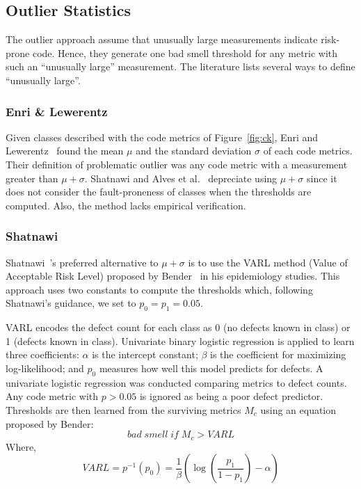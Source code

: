 \documentclass[twocolumn,5p]{elsarticle}
\newcommand{\fig}[1]{Figure~\ref{fig:#1}}
\theoremstyle{break}
\begin{document}
	\subsection{Outlier Statistics}
	
	The outlier approach assume that unusually large measurements indicate risk-prone code.
	Hence, they generate one bad smell threshold for any metric
	with such an ``unusually large'' measurement. 
	The literature lists several ways to define ``unusually large''.
	
	
	
	
	\subsubsection{Enri \& Lewerentz}
	Given classes described with the  code metrics of \fig{ck},
	Enri and Lewerentz~\cite{erni96} found the   mean $\mu$ and the standard deviation $\sigma$
	of each
	code metrics. Their definition of problematic outlier was any code
	metric with a measurement greater than $\mu+\sigma$.
	Shatnawi and Alves et al.~\cite{Shatnawi10,Alves2010} depreciate
	using $\mu+\sigma$ since it does not consider the fault-proneness of classes when the thresholds are computed. Also, the method lacks  empirical verification.
	
	\subsubsection{ Shatnawi}\label{sect:shatnawi}
	Shatnawi~\cite{Shatnawi10}'s preferred alternative to $\mu+\sigma$
	is to use the VARL method (Value of Acceptable Risk Level) proposed by Bender~\cite{bender99} in his epidemiology studies.  This approach uses two
	constants to compute the thresholds which, following Shatnawi's guidance, we set to
	$p_0=p_1=0.05$.
	
	
	
	VARL encodes the defect count
	for each class as 0 (no defects known in class) or 1 (defects known in class).
	Univariate binary logistic regression is applied to learn three coefficients:  
	$\alpha$ is the intercept constant;
	$\beta$ is the coefficient for maximizing log-likelihood;
	and $p_0$ 
	measures   how well this  model predicts for  defects. A univariate logistic regression was conducted comparing metrics to defect counts. Any code metric with $p>0.05$ is ignored as being a poor defect predictor. Thresholds are then learned from the surviving metrics $M_c$ using
	an equation proposed by Bender:
	$$ \mathit{bad\; smell\; if\;} M_c > VARL$$
	Where,
	\begin{equation}
		VARL = p^{-1}(p_0) =  \frac{1}{\beta }\left( {\log \left( {\frac{{{p_1}}}{{1 - {p_1}}}} \right) - \alpha } \right) 
	\end{equation}
	
\end{document}
